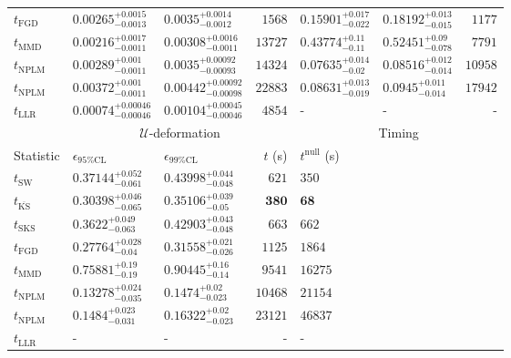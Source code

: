 \begin{tabular}{l|llr|llr}
	$t_{\mathrm{FGD}}$ & $0.00265_{-0.0013}^{+0.0015}$ & $0.0035_{-0.0012}^{+0.0014}$ & $1568$ & ${\mathbf{0.15901_{-0.022}^{+0.017}}}$ & ${\mathbf{0.18192_{-0.015}^{+0.013}}}$ & $1177$ \\
	$t_{\mathrm{MMD}}$ & ${\mathbf{0.00216_{-0.0011}^{+0.0017}}}$ & ${\mathbf{0.00308_{-0.0011}^{+0.0016}}}$ & $13727$ & $0.43774_{-0.11}^{+0.11}$ & $0.52451_{-0.078}^{+0.09}$ & $7791$ \\
\rowcolor{red!35}	$t_{\mathrm{NPLM}}$ & $0.00289_{-0.0011}^{+0.001}$ & $0.0035_{-0.00093}^{+0.00092}$ & $14324$ & $0.07635_{-0.02}^{+0.014}$ & $0.08516_{-0.014}^{+0.012}$ & $10958$ \\
\rowcolor{blue!35}	$t_{\mathrm{NPLM}}$ & $0.00372_{-0.0011}^{+0.001}$ & $0.00442_{-0.00098}^{+0.00092}$ & $22883$ & $0.08631_{-0.019}^{+0.013}$ & $0.0945_{-0.014}^{+0.011}$ & $17942$ \\
	$t_{\mathrm{LLR}}$ & $0.00074_{-0.00046}^{+0.00046}$ & $0.00104_{-0.00046}^{+0.00045}$ & $4854$ & - & - & - \\
	\toprule
	\multicolumn{1}{c}{} & \multicolumn{3}{c}{$\mathcal{U}$-deformation} & \multicolumn{3}{c}{Timing} \\
	Statistic & $\epsilon_{95\%\mathrm{CL}}$ & $\epsilon_{99\%\mathrm{CL}}$ & $t$ (s) & $t^{\mathrm{null}}$ (s) \\
	\midrule
	$t_{\mathrm{SW}}$ & $0.37144_{-0.061}^{+0.052}$ & $0.43998_{-0.048}^{+0.044}$ & $621$ & $350$ \\
	$t_{\overline{\mathrm{KS}}}$ & $0.30398_{-0.065}^{+0.046}$ & $0.35106_{-0.05}^{+0.039}$ & ${\mathbf{380}}$ & ${\mathbf{68}}$ \\
	$t_{\mathrm{SKS}}$ & $0.3622_{-0.063}^{+0.049}$ & $0.42903_{-0.048}^{+0.043}$ & $663$ & $662$ \\
	$t_{\mathrm{FGD}}$ & ${\mathbf{0.27764_{-0.04}^{+0.028}}}$ & ${\mathbf{0.31558_{-0.026}^{+0.021}}}$ & $1125$ & $1864$ \\
	$t_{\mathrm{MMD}}$ & $0.75881_{-0.19}^{+0.19}$ & $0.90445_{-0.14}^{+0.16}$ & $9541$ & $16275$ \\
\rowcolor{red!35}	$t_{\mathrm{NPLM}}$ & $0.13278_{-0.035}^{+0.024}$ & $0.1474_{-0.023}^{+0.02}$ & $10468$ & $21154$ \\
\rowcolor{blue!35}	$t_{\mathrm{NPLM}}$ & $0.1484_{-0.031}^{+0.023}$ & $0.16322_{-0.023}^{+0.02}$ & $23121$ & $46837$ \\
	$t_{\mathrm{LLR}}$ & - & - & - & - \\
	\bottomrule
\end{tabular}
